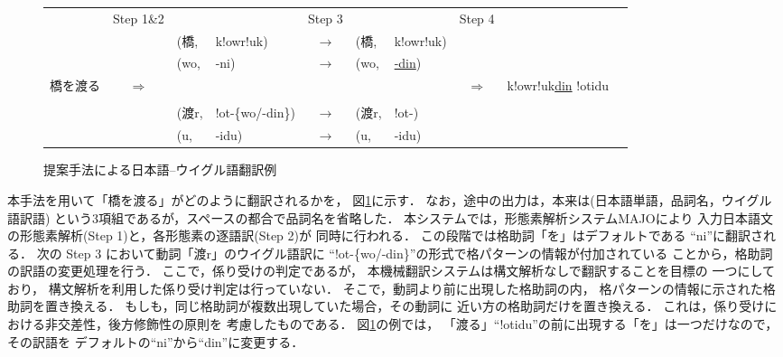 \begin{figure}[tbp]
\begin{center}
\setlength{\tabcolsep}{4pt}
\begin{tabular}[t]{lc|ll|c|ll|ccc}
&\multicolumn{1}{c}{Step 1\&2} & \multicolumn{2}{c}{}&
\multicolumn{1}{c}{Step 3} & &\multicolumn{1}{c}{}&Step 4& 
\vspace{5pt}\\
\cline{3-4}
\cline{6-7}
& & (橋,& k!owr!uk) & $\rightarrow$ & (橋, &k!owr!uk) & & \\
& & (wo,& -ni) & $\rightarrow$ &
(wo,&\underline{-din}) & &\vspace{-7pt} \\
\cline{1-1}\cline{9-9}
\multicolumn{1}{|l|}{橋を渡る}& $\Rightarrow$ & & & & & &
$\Rightarrow$ & 
\multicolumn{1}{|l|}{k!owr!uk\underline{din} !otidu} \\
\cline{1-1}\cline{9-9}\vspace{-25pt} \\
& & (渡r,& !ot-\{wo/-din\}) &
$\rightarrow$ & (渡r,& !ot-) \\
& & (u,& -idu) &$\rightarrow$ & (u,& -idu) & \\
\cline{3-4}
\cline{6-7}
\end{tabular}
\caption{提案手法による日本語--ウイグル語翻訳例}
\label{fig:translate}
\end{center}
\end{figure}

本手法を用いて「橋を渡る」がどのように翻訳されるかを，
図\ref{fig:translate}に示す．
なお，途中の出力は，本来は(日本語単語，品詞名，ウイグル語訳語)
という3項組であるが，スペースの都合で品詞名を省略した．
本システムでは，形態素解析システムMAJOにより
入力日本語文の形態素解析(Step 1)と，各形態素の逐語訳(Step 2)が
同時に行われる．
この段階では格助詞「を」はデフォルトである ``ni''に翻訳される．
次の Step 3 において動詞「渡r」のウイグル語訳に
``!ot-\{wo/-din\}''の形式で格パターンの情報が付加されている
ことから，格助詞の訳語の変更処理を行う．
ここで，係り受けの判定であるが，
本機械翻訳システムは構文解析なしで翻訳することを目標の
一つにしており，
構文解析を利用した係り受け判定は行っていない．
そこで，動詞より前に出現した格助詞の内，
格パターンの情報に示された格助詞を置き換える．
もしも，同じ格助詞が複数出現していた場合，その動詞に
近い方の格助詞だけを置き換える．
これは，係り受けにおける非交差性，後方修飾性の原則を
考慮したものである．
図\ref{fig:translate}の例では，
「渡る」``!otidu''の前に出現する「を」は一つだけなので，その訳語を
デフォルトの``ni''から``din''に変更する．

